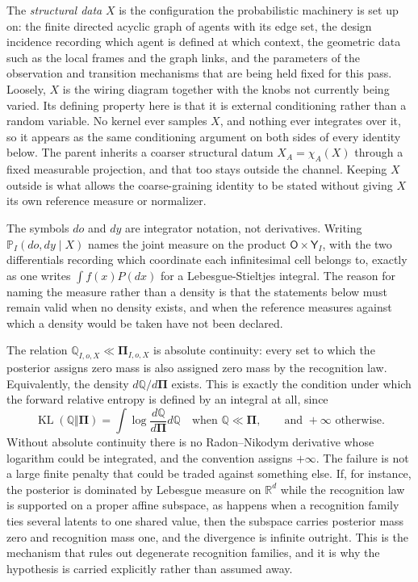 \documentclass[11pt,letterpaper]{article}
\newcommand{\KL}{\operatorname{KL}}
\newcommand{\Prob}{\mathbb P}
\newcommand{\Rec}{\mathbb Q}
\newcommand{\Post}{\boldsymbol\Pi}
\begin{document}
The \emph{structural data} \(X\) is the configuration the probabilistic machinery is set up on: the finite directed acyclic graph of agents with its edge set, the design incidence recording which agent is defined at which context, the geometric data such as the local frames and the graph links, and the parameters of the observation and transition mechanisms that are being held fixed for this pass. Loosely, \(X\) is the wiring diagram together with the knobs not currently being varied. Its defining property here is that it is external conditioning rather than a random variable. No kernel ever samples \(X\), and nothing ever integrates over it, so it appears as the same conditioning argument on both sides of every identity below. The parent inherits a coarser structural datum \(X_A=\chi_A(X)\) through a fixed measurable projection, and that too stays outside the channel. Keeping \(X\) outside is what allows the coarse-graining identity to be stated without giving \(X\) its own reference measure or normalizer.

The symbols \(do\) and \(dy\) are integrator notation, not derivatives. Writing \(\Prob_I(do,dy\mid X)\) names the joint measure on the product \(\mathsf O\times\mathsf Y_I\), with the two differentials recording which coordinate each infinitesimal cell belongs to, exactly as one writes \(\int f(x)P(dx)\) for a Lebesgue-Stieltjes integral. The reason for naming the measure rather than a density is that the statements below must remain valid when no density exists, and when the reference measures against which a density would be taken have not been declared.

The relation \(\Rec_{I,o,X}\ll\Post_{I,o,X}\) is absolute continuity: every set to which the posterior assigns zero mass is also assigned zero mass by the recognition law. Equivalently, the density \(d\Rec/d\Post\) exists. This is exactly the condition under which the forward relative entropy is defined by an integral at all, since
\[
  \KL(\Rec\Vert\Post)
  =\int\log\frac{d\Rec}{d\Post}d\Rec
  \quad\text{when }\Rec\ll\Post,
  \qquad\text{and }+\infty\text{ otherwise.}
\]
Without absolute continuity there is no Radon--Nikodym derivative whose logarithm could be integrated, and the convention assigns \(+\infty\). The failure is not a large finite penalty that could be traded against something else. If, for instance, the posterior is dominated by Lebesgue measure on \(\mathbb R^d\) while the recognition law is supported on a proper affine subspace, as happens when a recognition family ties several latents to one shared value, then the subspace carries posterior mass zero and recognition mass one, and the divergence is infinite outright. This is the mechanism that rules out degenerate recognition families, and it is why the hypothesis is carried explicitly rather than assumed away.
\end{document}
